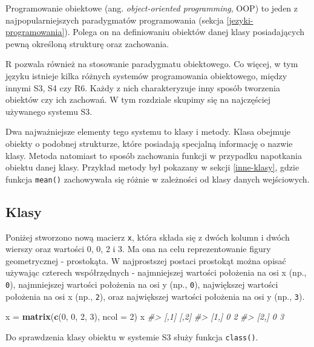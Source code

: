\documentclass[paper=6in:9in,pagesize=pdftex,headinclude=on,footinclude=on,10pt]{scrbook}
\newenvironment{Shaded}{\begin{snugshade}}{\end{snugshade}}
\newcommand{\CommentTok}[1]{\textcolor[rgb]{0.56,0.35,0.01}{\textit{#1}}}
\newcommand{\DataTypeTok}[1]{\textcolor[rgb]{0.13,0.29,0.53}{#1}}
\newcommand{\DecValTok}[1]{\textcolor[rgb]{0.00,0.00,0.81}{#1}}
\newcommand{\KeywordTok}[1]{\textcolor[rgb]{0.13,0.29,0.53}{\textbf{#1}}}
\newcommand{\NormalTok}[1]{#1}
\newcommand{\StringTok}[1]{\textcolor[rgb]{0.31,0.60,0.02}{#1}}
\begin{document}
Programowanie obiektowe (ang. \emph{object-oriented programming}, OOP) to jeden z najpopularniejszych paradygmatów programowania (sekcja \ref{jezyki-programowania}).
Polega on na definiowaniu obiektów danej klasy posiadających pewną określoną strukturę oraz zachowania.

R pozwala również na stosowanie paradygmatu obiektowego.
Co więcej, w tym języku istnieje kilka różnych systemów programowania obiektowego, między innymi S3, S4 czy R6.
Każdy z nich charakteryzuje inny sposób tworzenia obiektów czy ich zachowań.
W tym rozdziale skupimy się na najczęściej używanego systemu S3.

Dwa najważniejsze elementy tego systemu to klasy i metody.
Klasa obejmuje obiekty o podobnej strukturze, które posiadają specjalną informację o nazwie klasy.
Metoda natomiast to sposób zachowania funkcji w przypadku napotkania obiektu danej klasy.
Przykład metody był pokazany w sekcji \ref{inne-klasy}, gdzie funkcja \texttt{mean()} zachowywała się różnie w zależności od klasy danych wejściowych.

\hypertarget{klasy}{%
\subsection{Klasy}\label{klasy}}

Poniżej stworzono nową macierz \texttt{x}, która składa się z dwóch kolumn i dwóch wierszy oraz wartości 0, 0, 2 i 3.
Ma ona na celu reprezentowanie figury geometrycznej - prostokąta.
W najprostszej postaci prostokąt można opisać używając czterech współrzędnych - najmniejszej wartości położenia na osi x (np., \texttt{0}), najmniejszej wartości położenia na osi y (np., \texttt{0}), największej wartości położenia na osi x (np., \texttt{2}), oraz największej wartości położenia na osi y (np., \texttt{3}).

\begin{Shaded}
\begin{Highlighting}[]
\NormalTok{x =}\StringTok{ }\KeywordTok{matrix}\NormalTok{(}\KeywordTok{c}\NormalTok{(}\DecValTok{0}\NormalTok{, }\DecValTok{0}\NormalTok{, }\DecValTok{2}\NormalTok{, }\DecValTok{3}\NormalTok{), }\DataTypeTok{ncol =} \DecValTok{2}\NormalTok{)}
\NormalTok{x}
\CommentTok{#>      [,1] [,2]}
\CommentTok{#> [1,]    0    2}
\CommentTok{#> [2,]    0    3}
\end{Highlighting}
\end{Shaded}

Do sprawdzenia klasy obiektu w systemie S3 służy funkcja \texttt{class()}.
\end{document}
